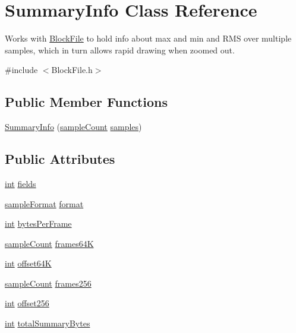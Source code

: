 \hypertarget{class_summary_info}{}\section{Summary\+Info Class Reference}
\label{class_summary_info}


Works with \hyperlink{class_block_file}{Block\+File} to hold info about max and min and R\+MS over multiple samples, which in turn allows rapid drawing when zoomed out.  




{\ttfamily \#include $<$Block\+File.\+h$>$}

\subsection*{Public Member Functions}
\begin{DoxyCompactItemize}
\item 
\hyperlink{class_summary_info_a7df4df01af50e1d64556c32db97d0822}{Summary\+Info} (\hyperlink{include_2audacity_2_types_8h_afa427e1f521ea5ec12d054e8bd4d0f71}{sample\+Count} \hyperlink{test__w__saw8_8c_a54185623a5a093f671a73e5fba6197a1}{samples})
\end{DoxyCompactItemize}
\subsection*{Public Attributes}
\begin{DoxyCompactItemize}
\item 
\hyperlink{xmltok_8h_a5a0d4a5641ce434f1d23533f2b2e6653}{int} \hyperlink{class_summary_info_a542593f4e293ce5ea69da7a0febdcea5}{fields}
\item 
\hyperlink{include_2audacity_2_types_8h_a9938d2e2f6adef23e745cd80ef379792}{sample\+Format} \hyperlink{class_summary_info_afaa245d4d0a8dbc327b10ad71063bd8b}{format}
\item 
\hyperlink{xmltok_8h_a5a0d4a5641ce434f1d23533f2b2e6653}{int} \hyperlink{class_summary_info_a874942fe0174f7030bb0ad8361780bfd}{bytes\+Per\+Frame}
\item 
\hyperlink{include_2audacity_2_types_8h_afa427e1f521ea5ec12d054e8bd4d0f71}{sample\+Count} \hyperlink{class_summary_info_a20e734e06be335e039aeedc1c2833ece}{frames64K}
\item 
\hyperlink{xmltok_8h_a5a0d4a5641ce434f1d23533f2b2e6653}{int} \hyperlink{class_summary_info_aca2983511bb953ffa03d1d007fac7ab7}{offset64K}
\item 
\hyperlink{include_2audacity_2_types_8h_afa427e1f521ea5ec12d054e8bd4d0f71}{sample\+Count} \hyperlink{class_summary_info_a00a14b80fc6fd53b1a487d3c330e5ab0}{frames256}
\item 
\hyperlink{xmltok_8h_a5a0d4a5641ce434f1d23533f2b2e6653}{int} \hyperlink{class_summary_info_ab41427f2e0bf3978ffec891676cdd794}{offset256}
\item 
\hyperlink{xmltok_8h_a5a0d4a5641ce434f1d23533f2b2e6653}{int} \hyperlink{class_summary_info_a4d7f7e6b04369c78c001cb46390a9d96}{total\+Summary\+Bytes}
\end{DoxyCompactItemize}


